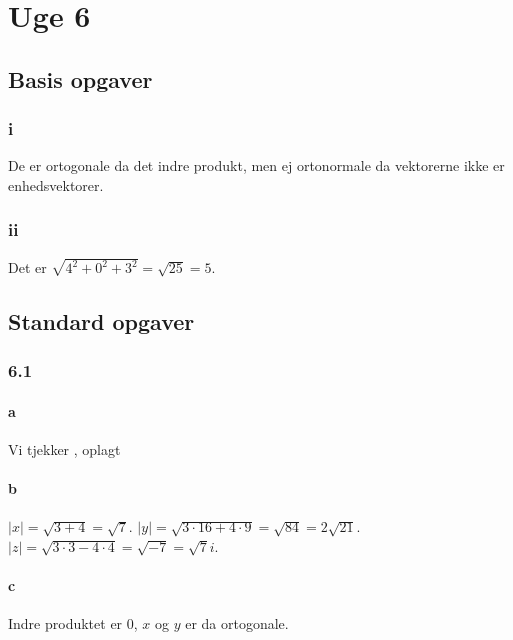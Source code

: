 
\chapter{Uge 6}

	\section{Basis opgaver}

		\subsection{i}

			De er ortogonale da det indre produkt, men ej ortonormale da vektorerne ikke er enhedsvektorer.

		\subsection{ii}

			Det er $\sqrt{4^2+0^2+3^2}=\sqrt{25}=5$.

	\section{Standard opgaver}

		\subsection{6.1}

			\subsubsection{a}

				Vi tjekker \cite[Definition 6.1.1]{hesselholt2017}, oplagt

			\subsubsection{b}

				$|x|=\sqrt{3+4}=\sqrt{7}$. $|y|=\sqrt{3\cdot 16+ 4 \cdot 9}=\sqrt{84}=2\sqrt{21}$. $|z|=\sqrt{3\cdot 3 - 4\cdot 4}=\sqrt{-7}=\sqrt{7}i$.

			\subsubsection{c}

				Indre produktet er $0$, $x$ og $y$ er da ortogonale.

